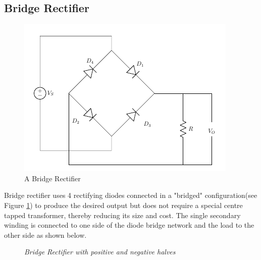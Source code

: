 		\subsection{Bridge Rectifier}
			\begin{figure}[h]
				\centering
				\includegraphics[width=0.5\linewidth]{img/exp7/14}
				\caption{A Bridge Rectifier}
				\label{fig:fwr_bridgeRectifier}
			\end{figure}
			Bridge rectifier uses 4 rectifying diodes connected in a "bridged" configuration(see Figure \ref{fig:fwr_bridgeRectifier}) to produce the desired output but does not require a special centre tapped transformer, thereby reducing its size and cost. The single secondary winding is connected to one side of the diode bridge network and the load to the other side as shown below.
			\begin{figure}[ht]
				\centering 
				\hfill
				\caption{\textit{Bridge Rectifier with positive and negative halves}}
			\end{figure}
			
